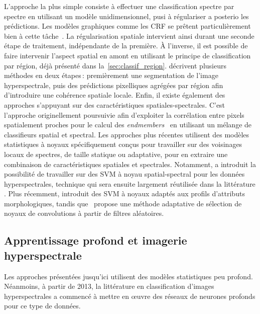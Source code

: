 L'approche la plus simple consiste à effectuer une classification spectre par spectre en utilisant un modèle unidimensionnel, pusi à régulariser a posterio les prédictions. Les modèles graphiques comme les \gls{CRF} se prêtent particulièrement bien à cette tâche~\cite{wu_semi-supervised_2016}. La régularisation spatiale intervient ainsi durant une seconde étape de traitement, indépendante de la première.
À l'inverse, il est possible de faire intervenir l'aspect spatial en amont en utilisant le principe de classification par région, déjà présenté dans la~\cref{sec:classif_region}. \citet{tarabalka_segmentation_2010,fauvel_advances_2013} décrivent plusieurs méthodes en deux étapes\,: premièrement une segmentation de l'image hyperspectrale, puis des prédictions pixelliques agrégées par région afin d'introduire une cohérence spatiale locale.
Enfin, il existe également des approches s'appuyant sur des caractéristiques spatiales-spectrales. C'est l'approche originellement poursuivie afin d'exploiter la corrélation entre pixels spatialement proches pour le calcul des \textit{endmembers}~\cite{plaza_spatial/spectral_2002,dellacqua_exploiting_2004} en utilisant un mélange de classifieurs spatial et spectral. Les approches plus récentes utilisent des modèles statistiques à noyaux spécifiquement conçus pour travailler sur des voisinages locaux de spectres, de taille statique ou adaptative, pour en extraire une combinaison de caractéristiques spatiales et spectrales. Notamment, \citet{camps-valls_composite_2006} a introduit la possibilité de travailler sur des \gls{SVM} à noyau spatial-spectral pour les données hyperspectrales, technique qui sera ensuite largement réutilisée dans la littérature \cite{tarabalka_spectralspatial_2009,fauvel_spatial-spectral_2012}. Plus récemment, \citet{cui_scalable_2017} introduit des \gls{SVM} à noyaux adaptés aux profils d'attributs morphologiques, tandis que~\citet{tuia_multiclass_2015} propose une méthode adaptative de sélection de noyaux de convolutions à partir de filtres aléatoires.

\subsection{Apprentissage profond et imagerie hyperspectrale}

Les approches présentées jusqu'ici utilisent des modèles statistiques peu profond. Néanmoins, à partir de 2013, la littérature en classification d'images hyperspectrales a commencé à mettre en \oe{}uvre des réseaux de neurones profonds pour ce type de données.


